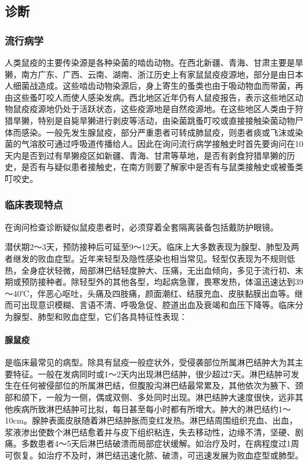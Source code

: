 \subsection{诊断}

\subsubsection{流行病学}

人类鼠疫的主要传染源是各种染菌的啮齿动物。在西北新疆、青海、甘肃主要是旱獭，南方广东、广西、云南、湖南、浙江历史上有家鼠鼠疫疫源地，部分是由日本人细菌战造成。这些啮齿动物染源后，身上寄生的蚤类也由于吸动物血而带菌，再由这些蚤叮咬人而使人感染发病。西北地区近年仍有人鼠疫报告，表示这些地区动物鼠疫疫源地仍处于活跃状态，这些疫源地是自然疫源地。在这些地区人类由于狩猎旱獭，特别是自毙旱獭进行剥皮等活动，由染菌跳蚤叮咬或直接接触染菌动物尸体而感染。一般先发生腺鼠疫，部分严重患者可转成肺鼠疫，则患者痰或飞沫或染菌的气溶胶可通过呼吸道传播给人。因此在询问流行病学接触史时首先要询问在10天内是否到过有旱獭疫区如新疆、青海、甘肃等草地，是否有剥食狩猎旱獭的历史，是否有与疑似患者接触史，在南方则要了解家中是否有与鼠类接触史或被蚤类叮咬史。

\subsubsection{临床表现特点}

在询问检查诊断疑似鼠疫患者时，必须穿着全套隔离装备包括戴防护眼镜。

潜伏期2～3天，预防接种后可延至9～12天。临床上大多数表现为腺型、肺型及两者继发的败血症型。近年来轻型及隐性感染也相当常见。轻型仅表现为不规则低热，全身症状轻微，局部淋巴结轻度肿大、压痛，无出血倾向，多见于流行初、末期或预防接种者。除轻型外的其他各型，均起病急骤，畏寒发热，体温迅速达到39～40℃，伴恶心呕吐，头痛及四肢痛，颜面潮红、结膜充血、皮肤黏膜出血等。继而可出现意识模糊、言语不清、呼吸急促、腔道出血及衰竭和血压下降等。临床分为腺型、肺型和败血症型，它们各具特征性表现：

\paragraph{腺鼠疫}

是临床最常见的病型。除具有鼠疫一般症状外，受侵袭部位所属淋巴结肿大为其主要特征。一般在发病同时或1～2天内出现淋巴结肿，很少超过7天。淋巴结肿可发生在任何被侵部位的所属淋巴结，但腹股沟淋巴结最常累及，其他依次为腋下、颈部和颌下，一般为一侧，偶或双侧、多处同时出现。淋巴结肿大速度很快，远非其他疾病所致淋巴结肿可比拟，每日甚至每小时都有所增大。肿大的淋巴结约1～10cm。腺肿表面皮肤随着淋巴结肿胀而变红发热。淋巴结周围组织充血、出血，浆液渗出使数个淋巴结愈着并与皮下组织粘连，失去移动性，边缘不清，坚硬、剧痛。多数患者4～5天后淋巴结破溃而局部症状缓解。如治疗及时，在病程度过1周可恢复。如治疗不及时，淋巴结迅速化脓、破溃，可迅速发展为败血症型或肺型。

